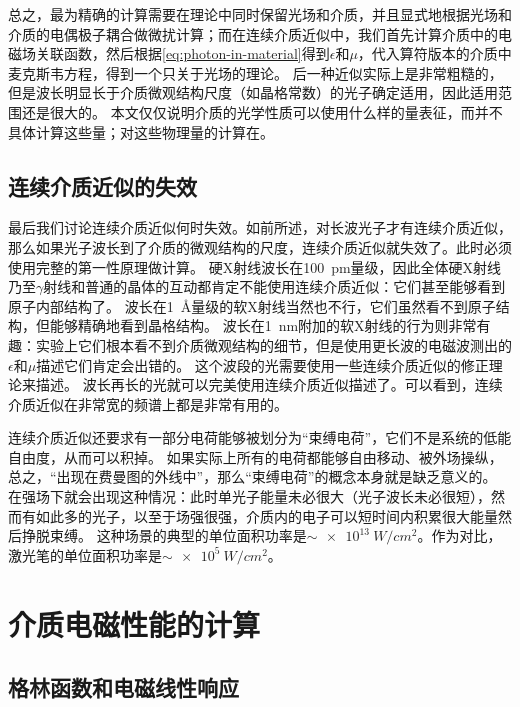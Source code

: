 总之，最为精确的计算需要在理论中同时保留光场和介质，并且显式地根据光场和介质的电偶极子耦合做微扰计算；而在连续介质近似中，我们首先计算介质中的电磁场关联函数，然后根据\eqref{eq:photon-in-material}得到$\epsilon$和$\mu$，代入算符版本的介质中麦克斯韦方程，得到一个只关于光场的理论。
后一种近似实际上是非常粗糙的，但是波长明显长于介质微观结构尺度（如晶格常数）的光子确定适用，因此适用范围还是很大的。
本文仅仅说明介质的光学性质可以使用什么样的量表征，而并不具体计算这些量；对这些物理量的计算在。

\subsection{连续介质近似的失效}

最后我们讨论连续介质近似何时失效。如前所述，对长波光子才有连续介质近似，那么如果光子波长到了介质的微观结构的尺度，连续介质近似就失效了。此时必须使用完整的第一性原理做计算。
硬X射线波长在\SI{100}{pm}量级，因此全体硬X射线乃至$\gamma$射线和普通的晶体的互动都肯定不能使用连续介质近似：它们甚至能够看到原子内部结构了。
波长在\SI{1}{\angstrom}量级的软X射线当然也不行，它们虽然看不到原子结构，但能够精确地看到晶格结构。
波长在\SI{1}{nm}附加的软X射线的行为则非常有趣：实验上它们根本看不到介质微观结构的细节，但是使用更长波的电磁波测出的$\epsilon$和$\mu$描述它们肯定会出错的。
这个波段的光需要使用一些连续介质近似的修正理论来描述。
波长再长的光就可以完美使用连续介质近似描述了。可以看到，连续介质近似在非常宽的频谱上都是非常有用的。

连续介质近似还要求有一部分电荷能够被划分为“束缚电荷”，它们不是系统的低能自由度，从而可以积掉。
如果实际上所有的电荷都能够自由移动、被外场操纵，总之，“出现在费曼图的外线中”，那么“束缚电荷”的概念本身就是缺乏意义的。
在强场下就会出现这种情况：此时单光子能量未必很大（光子波长未必很短），然而有如此多的光子，以至于场强很强，介质内的电子可以短时间内积累很大能量然后挣脱束缚。
这种场景的典型的单位面积功率是$\sim\SI{e13}{W/cm^2}$。作为对比，激光笔的单位面积功率是$\sim \SI{e5}{W/cm^2}$。

\section{介质电磁性能的计算}

\subsection{格林函数和电磁线性响应}\label{sec:green-and-linear-response}


